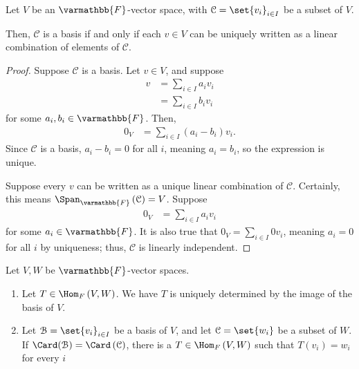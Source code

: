\documentclass[10pt]{mypackage}
\renewcommand*{\mathbb}[1]{\varmathbb{#1}}
\begin{document}
\begin{lemma}
  Let $V$ be an $\mathbb{F}$-vector space, with $\mathcal{C} = \set{v_i}_{i\in I}$ be a subset of $V$.\newline

  Then, $\mathcal{C}$ is a basis if and only if each $v\in V$ can be uniquely written as a linear combination of elements of $\mathcal{C}$.
\end{lemma}
\begin{proof}
  Suppose $\mathcal{C}$ is a basis. Let $v\in V$, and suppose
  \begin{align*}
    v &= \sum_{i\in I}a_iv_i\\
      &= \sum_{i\in I}b_iv_i
  \end{align*}
  for some $a_i,b_i\in \mathbb{F}$. Then,
  \begin{align*}
    0_V &= \sum_{i\in I}\left(a_i - b_i\right)v_i.
  \end{align*}
  Since $\mathcal{C}$ is a basis, $a_i - b_i = 0$ for all $i$, meaning $a_i = b_i$, so the expression is unique.\newline

  Suppose every $v$ can be written as a unique linear combination of $\mathcal{C}$. Certainly, this means $\Span_{\mathbb{F}}\left(\mathcal{C}\right) = V$. Suppose
  \begin{align*}
    0_V &= \sum_{i\in I}a_iv_i
  \end{align*}
  for some $a_i\in \mathbb{F}$. It is also true that $0_V = \sum_{i\in I}0v_i$, meaning $a_i = 0$ for all $i$ by uniqueness; thus, $\mathcal{C}$ is linearly independent.
\end{proof}
\begin{proposition}
  Let $V,W$ be $\mathbb{F}$-vector spaces.
  \begin{enumerate}[(1)]
    \item Let $T\in \Hom_{F}\left(V,W\right)$. We have $T$ is uniquely determined by the image of the basis of $V$.
    \item Let $\mathcal{B}=\set{v_i}_{i\in I}$ be a basis of $V$, and let $\mathcal{C} = \set{w_i}$ be a subset of $W$. If $\Card(\mathcal{B}) = \Card\left(\mathcal{C}\right)$, there is a $T\in \Hom_{F}\left(V,W\right)$ such that $T\left(v_i\right) = w_i$ for every $i$
  \end{enumerate}
\end{proposition}
\end{document}
